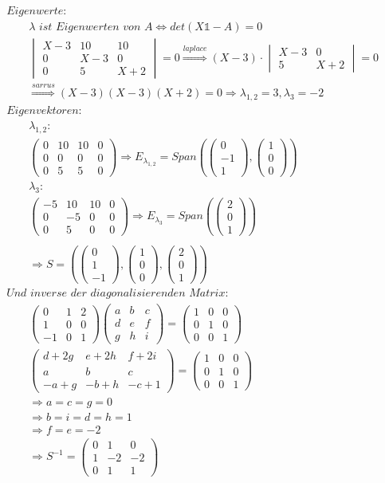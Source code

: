 \documentclass[titlepage]{article}
\newcommand{\1}{\mathbb{1}}
\newcommand{\0}{\mathbb{0}}
\newcommand{\vecD}[3]{\left(\begin{smallmatrix}#1\\#2\\#3\end{smallmatrix}\right)}
\newcommand{\detZ}[4]{\begin{vmatrix}#1&#2\\#3&#4\end{vmatrix}}
\newcommand{\detD}[9]{\begin{vmatrix}#1&#2&#3\\#4&#5&#6\\#7&#8&#9\end{vmatrix}}
\newcommand{\matrixD}[9]{\begin{pmatrix}#1&#2&#3\\#4&#5&#6\\#7&#8&#9\end{pmatrix}}
\begin{document}
			\begin{align*}
				&\textit{Eigenwerte: }\\
				&\quad\quad\lambda\textit{ ist Eigenwerten von }A\Leftrightarrow det(X\1-A)=0\\
				&\quad\quad\detD{X-3}{10}{10}{0}{X-3}{0}{0}{5}{X+2}=0\overset{laplace}{\Rightarrow}(X-3)\cdot\detZ{X-3}{0}{5}{X+2}=0\\
				&\quad\quad\overset{sarrus}{\Rightarrow}(X-3)(X-3)(X+2)=0\Rightarrow\lambda_{1,2}=3,\lambda_3=-2\\
				&\textit{Eigenvektoren: }\\
				&\quad\quad\lambda_{1,2}:\\
				&\quad\quad
				\left(\begin{array}{ccc|c}
					0&10&10&0\\0&0&0&0\\0&5&5&0
				\end{array}\right)
				\Rightarrow E_{\lambda_{1,2}}=Span(\vecD{0}{-1}{1},\vecD{1}{0}{0})\\
				&\quad\quad\lambda_3:\\
				&\quad\quad\left(\begin{array}{ccc|c}
					-5&10&10&0\\0&-5&0&0\\0&5&0&0
				\end{array}\right)
				\Rightarrow E_{\lambda_3}=Span(\vecD{2}{0}{1})\\\\
				&\quad\quad\Rightarrow S=(\vecD{0}{1}{-1},\vecD{1}{0}{0},\vecD{2}{0}{1})\\
				&\textit{Und inverse der diagonalisierenden Matrix:}\\
				&\quad\quad\matrixD{0}{1}{2}{1}{0}{0}{-1}{0}{1}\matrixD{a}{b}{c}{d}{e}{f}{g}{h}{i}=\matrixD{1}{0}{0}{0}{1}{0}{0}{0}{1}\\
				&\quad\quad\matrixD{d+2g}{e+2h}{f+2i}{a}{b}{c}{-a+g}{-b+h}{-c+1}=\matrixD{1}{0}{0}{0}{1}{0}{0}{0}{1}\\
				&\quad\quad\Rightarrow a=c=g=0\\
				&\quad\quad\Rightarrow b=i=d=h=1\\
				&\quad\quad\Rightarrow f=e=-2\\
				&\quad\quad\Rightarrow S^{-1}=\matrixD{0}{1}{0}{1}{-2}{-2}{0}{1}{1}\\
			\end{align*}\
	
\end{document}
